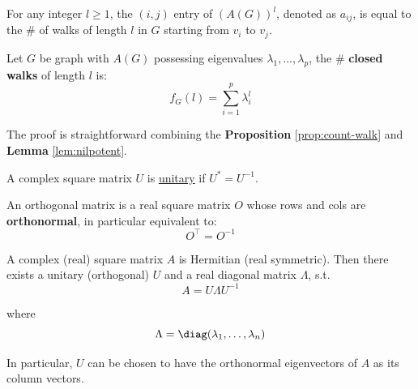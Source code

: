 \begin{proposition}
	\label{prop:count-walk}
	For any integer \( l \geq 1 \), the \( (i,j) \) entry of \( (A(G))^l \), denoted as \( a_{ij} \), is equal to the \( \# \) of walks of length \( l \) in \( G \) starting from \( v_i \) to \( v_j \).
\end{proposition}

\begin{theorem}
	Let \( G \) be graph with \( A(G) \) possessing eigenvalues \( \lambda_1, \ldots, \lambda_p \), the \( \# \) \textbf{closed walks} of length \( l \) is:
	\[
		f_{G}(l) = \sum_{i=1}^p \lambda_i^l
	\]
\end{theorem}

The proof is straightforward combining the \textbf{Proposition} \ref{prop:count-walk} and \textbf{Lemma} \ref{lem:nilpotent}.

\begin{definition}
	A complex square matrix \( U \) is \underline{unitary} if \( U^* = U^{-1} \).
\end{definition}

\begin{definition}
	An orthogonal matrix is a real square matrix \( O \) whose rows and cols are \textbf{orthonormal}, in particular equivalent to:
	\[
		O^\intercal = O^{-1}
	\]
\end{definition}

\begin{theorem}
	\label{thm:spectral}
	A complex (real) square matrix \( A \) is Hermitian (real symmetric). Then there exists a unitary (orthogonal) \( U \) and a real diagonal matrix \( \Lambda \), s.t.
	\[
		A = U \Lambda U^{-1}
	\]

	where
	\[
		\Lambda = \diag(\lambda_1, \ldots,\lambda_n)
	\]

	In particular, \( U \) can be chosen to have the orthonormal eigenvectors of \( A \) as its column vectors.
\end{theorem}
